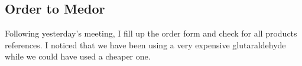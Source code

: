 \subsection{Order to Medor}
\label{task:20170122_cj1}

Following yesterday's meeting, I fill up the order form and check for all products references. I noticed that we have been using a very expensive glutaraldehyde while we could have used a cheaper one. 